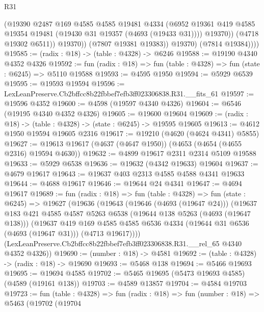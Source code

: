 \begin{lexlean}{R31}
\begin{coremodule}
                      (@19390
                        @2487
                        @169
                        @4585
                        @4585
                        @19481
                        @4334
                        (@6952
                          @19361
                          @419
                          @4585
                          @19354
                          @19481
                          (@19430 @31 @19357 (@4693 (@19433 @31))))
                        @19370))
                    (@4718 @19302 @6511))
                  @19370))
              (@7807 @19381 @19383))
            @19370)
          (@7814 @19384))))
@19585 := (radix : @18) -> (table : @4328) -> @6246
@19588 := @19190 @4340 @4352 @4326
@19592 := fun (radix : @18) => fun (table : @4328) => fun (state : @6245) => @5110 @19588
@19593 := @4595 @1950
@19594 := @5929 @6539
@19595 := @19593 @19594
@19596 := LexLeanPreserve.Cb2bffcc8b22fbbef7efb3ff023306838.R31.__fits_61
@19597 := @19596 @4352
@19600 := @4598 (@19597 @4340 @4326)
@19604 := @6546 (@19195 @4340 @4352 @4326)
@19605 := @19600 @19604
@19609 := (radix : @18) -> (table : @4328) -> (state : @6245) -> @19595 @19605
@19613 := @4612 @1950 @19594 @19605 @2316
@19617 := @19210 (@4620 (@4624 @4341) @5855)
@19627 := @19613 @19617 (@4637 (@4647 @1950)) (@4653 (@4654 (@4655 @2316) @19594 @4630))
@19632 := @4899 @19617 @2311 @2314 @5109 @19588
@19633 := @5929 @6538
@19636 := @19632 (@4342 @19633) @19604
@19637 := @4679 @19617
@19643 := @19637 @403 @2313 @4585 @4588 @4341 @19633
@19644 := @4688 @19617
@19646 := @19644 @24 @4341
@19647 := @4694 @19617
@19689 := fun (radix : @18) =>
  fun (table : @4328) =>
  fun (state : @6245) =>
  @19627
    (@19636
      (@19643
        (@19646 (@4693 (@19647 @24)))
        (@19637
          @183
          @421
          @4585
          @4587
          @5263
          @6538
          (@19644 @138 @5263 (@4693 (@19647 @138)))
          (@19637
            @419
            @169
            @4585
            @4585
            @6536
            @4334
            (@19644 @31 @6536 (@4693 (@19647 @31)))
            (@4713 @19617))))
      (LexLeanPreserve.Cb2bffcc8b22fbbef7efb3ff023306838.R31.__rel_65 @4340 @4352 @4326))
@19690 := (number : @18) -> @4581
@19692 := (table : @4328) -> (radix : @18) -> @19690
@19693 := @5468 @138
@19694 := @5466 @19693
@19695 := @19694 @4585
@19702 := @5465 @19695 (@5473 @19693 @4585) (@4589 (@19161 @138))
@19703 := @4589 @13857
@19704 := @4584 @19703
@19723 := fun (table : @4328) =>
  fun (radix : @18) =>
  fun (number : @18) =>
  @5463
    (@19702
      (@19704

\end{coremodule}
\end{lexlean}
